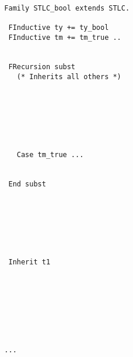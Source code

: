\begin{figure}[!htb]
  
  \begin{minipage}{\textwidth}
  \begin{multicols}{3}
  

  
  \begin{lstlisting}
  Family STLC_bool extends STLC. 

   FInductive ty += ty_bool
   FInductive tm += tm_true .. 
   

   FRecursion subst
     (* Inherits all others *)
   
   


   

   
     Case tm_true ...    


   End subst 



  

   

   Inherit t1








  ...
  \end{lstlisting}
  
  
  \columnbreak
  
  \begin{lstlisting}


\end{lstlisting}
\end{multicols}
\end{minipage}
\end{figure}

